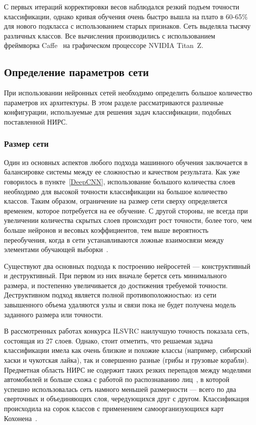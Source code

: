 \documentclass[a4paper,14pt]{extarticle} %
\begin{document}
С первых итераций корректировки весов наблюдался резкий подъем точности классификации, однако кривая обучения очень быстро вышла на плато в 60-65\% для нового подкласса с использованием старых признаков. Сеть выделяла тысячу различных классов. Все вычисления производились с использованием фреймворка Caffe~\cite{Caffe} на графическом процессоре NVIDIA Titan~Z.

\subsection{Определение параметров сети}
\hspace{\parindent} При использовании нейронных сетей необходимо определить большое количество параметров их архитектуры. В этом разделе рассматриваются различные конфигурации, используемые для решения задач классификации, подобных поставленной НИРС.

\subsubsection{Размер сети}
\hspace{\parindent} Один из основных аспектов любого подхода машинного обучения заключается в балансировке системы между ее сложностью и качеством результата. Как уже говорилось в пункте~\ref{DeepCNN}, использование большого количества слоев необходимо для высокой точности классификации на большое количество классов. Таким образом, ограничение на размер сети сверху определяется временем, которое потребуется на ее обучение. С другой стороны, не всегда при увеличении количества скрытых слоев происходит рост точности, более того, чем больше нейронов и весовых коэффициентов, тем выше вероятность переобучения, когда в сети устанавливаются ложные взаимосвязи между элементами обучающей выборки~\cite{NNsize}.

Существуют два основных подхода к построению нейросетей --- конструктивный и деструктивный. При первом из них вначале берется сеть минимального размера, и постепенно увеличивается до достижения требуемой точности. Деструктивном подход является полной противоположностью: из сети завышенного объема удаляются узлы и связи пока не будет получена модель заданного размера или точности. 

В рассмотренных работах конкурса ILSVRC наилучшую точность показала сеть, состоящая из 27 слоев. Однако, стоит отметить, что решаемая задача классификации имела как очень близкие и похожие классы (например, сибирский хаски и чукотская лайка), так и совершенно разные (грибы и грузовые корабли). Предметная область НИРС не содержит таких резких перепадов между моделями автомобилей и больше схожа с работой по распознаванию лиц~\cite{FaceRecognition}, в которой успешно использовалась сеть намного меньшей размерности --- всего по два сверточных и объединяющих слоя, чередующихся друг с другом. Классификация происходила на сорок классов с применением самоорганизующихся карт Кохонена~\cite{Kohonen}.
\end{document}
